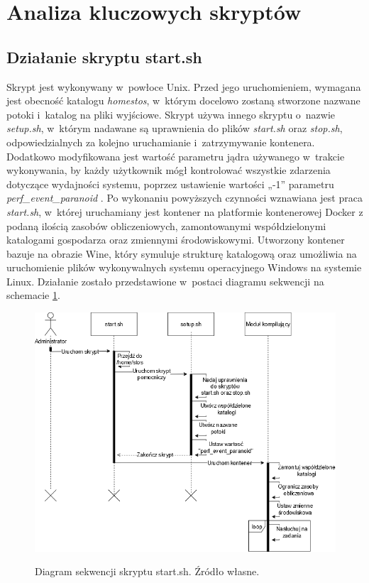 \section{Analiza kluczowych skryptów}
\subsection{Działanie skryptu start.sh}
\indent Skrypt jest wykonywany w~powłoce Unix. Przed jego uruchomieniem, wymagana jest obecność katalogu \textit{\/home\/stos}, w~którym docelowo zostaną stworzone nazwane potoki i~katalog na pliki wyjściowe. Skrypt używa innego skryptu o~nazwie \textit{setup.sh}, w~którym nadawane są uprawnienia do plików \textit{start.sh} oraz \textit{stop.sh}, odpowiedzialnych za kolejno uruchamianie i~zatrzymywanie kontenera. Dodatkowo modyfikowana jest wartość parametru jądra używanego w~trakcie wykonywania, by każdy użytkownik mógł kontrolować wszystkie zdarzenia dotyczące wydajności systemu, poprzez ustawienie wartości „-1” parametru \textit{perf\_event\_paranoid} \cite{perf}. Po wykonaniu powyższych czynności wznawiana jest praca \textit{start.sh}, w~której uruchamiany jest kontener na platformie kontenerowej Docker z podaną ilością zasobów obliczeniowych, zamontowanymi współdzielonymi katalogami gospodarza oraz zmiennymi środowiskowymi. Utworzony kontener bazuje na obrazie Wine, który symuluje strukturę katalogową oraz umożliwia na uruchomienie plików wykonywalnych systemu operacyjnego Windows na systemie Linux. Działanie zostało przedstawione w~postaci diagramu sekwencji na schemacie \ref{start}.
\begin{figure}[!h]
	\begin{center}
		\resizebox{1.0\textwidth}{!} {
			\includegraphics{img/2/start.png}
		}
		\caption[Diagram sekwenji skryptu start.sh]{Diagram sekwencji skryptu start.sh. Źródło własne.}
		\label{start}
	\end{center}
\end{figure}

